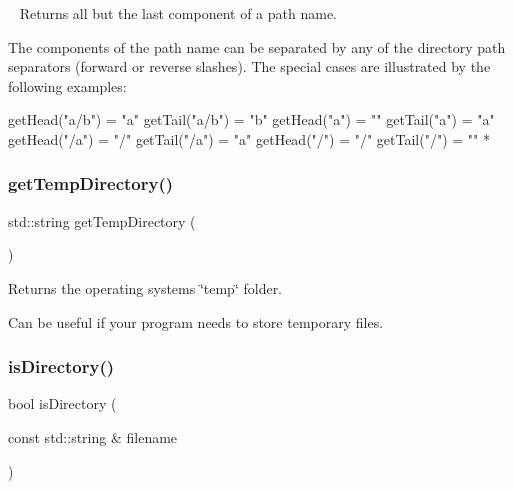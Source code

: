 ~\newline
 Returns all but the last component of a path name. 

The components of the path name can be separated by any of the directory path separators (forward or reverse slashes). The special cases are illustrated by the following examples\+:


\begin{DoxyPre}
     getHead("a/b")  = "a"     getTail("a/b")   = "b"
     getHead("a")    = ""      getTail("a")     = "a"
     getHead("/a")   = "/"     getTail("/a")    = "a"
     getHead("/")    = "/"     getTail("/")     = ""
*\end{DoxyPre}
 \mbox{\label{namespacesgl_1_1priv_1_1filelib_a10310c73e4177a77e32b1633fe7f515a}} 
\subsubsection{\texorpdfstring{get\+Temp\+Directory()}{getTempDirectory()}}
{\footnotesize\ttfamily std\+::string get\+Temp\+Directory (\begin{DoxyParamCaption}{ }\end{DoxyParamCaption})}



Returns the operating system\textquotesingle{}s \char`\"{}temp\char`\"{} folder. 

Can be useful if your program needs to store temporary files. \mbox{\label{namespacesgl_1_1priv_1_1filelib_a6d1006668c46c13773e52db398217475}} 
\subsubsection{\texorpdfstring{is\+Directory()}{isDirectory()}}
{\footnotesize\ttfamily bool is\+Directory (\begin{DoxyParamCaption}\item[{const std\+::string \&}]{filename }\end{DoxyParamCaption})}



